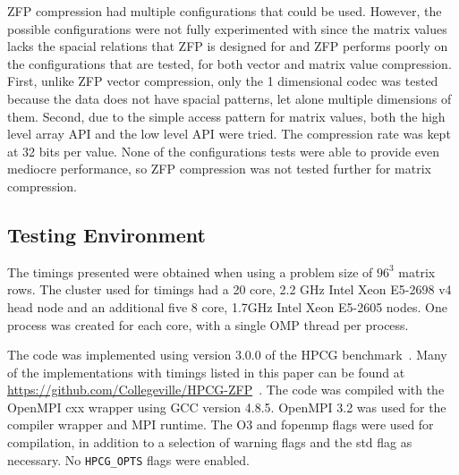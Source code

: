 ZFP compression had multiple configurations that could be used.
However, the possible configurations were not fully experimented with since the matrix values lacks the spacial relations that ZFP is designed for and ZFP performs poorly on the configurations that are tested, for both vector and matrix value compression.
First, unlike ZFP vector compression, only the 1 dimensional codec was tested because the data does not have spacial patterns, let alone multiple dimensions of them.
Second, due to the simple access pattern for matrix values, both the high level array API and the low level API were tried.
The compression rate was kept at 32 bits per value.
None of the configurations tests were able to provide even mediocre performance, so ZFP compression was not tested further for matrix compression.

\subsection{Testing Environment}
The timings presented were obtained when using a problem size of \(96^3\) matrix rows.
The cluster used for timings had a 20 core, 2.2 GHz Intel Xeon E5-2698 v4 head node and an additional five 8 core, 1.7GHz Intel Xeon E5-2605 nodes.
One process was created for each core, with a single OMP thread per process.

The code was implemented using version 3.0.0 of the HPCG benchmark~\cite{Dongarra:2015:HPCG}.
Many of the implementations with timings listed in this paper can be found at \url{https://github.com/Collegeville/HPCG-ZFP}~\cite{Lindquist:2018:projectGithub}.
The code was compiled with the OpenMPI cxx wrapper using GCC version 4.8.5.
OpenMPI 3.2 was used for the compiler wrapper and MPI runtime.
The O3 and fopenmp flags were used for compilation, in addition to a selection of warning flags and the std flag as necessary.
No \texttt{HPCG\_OPTS} flags were enabled.